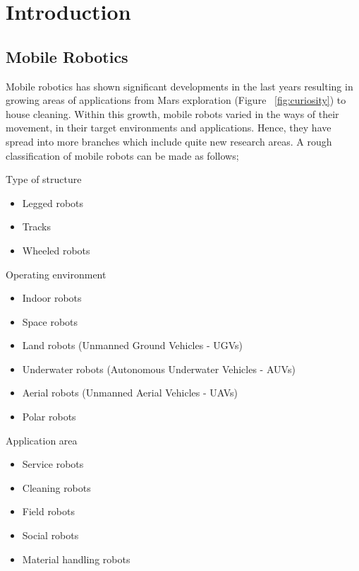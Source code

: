 
\chapter{Introduction}
\label{chap:intro}

\section{Mobile Robotics}
\label{sec:mobile robotics}

Mobile robotics has shown significant developments in the last years resulting in growing areas of applications from Mars exploration (Figure ~\ref{fig:curiosity}) to house cleaning. Within this growth, mobile robots varied in the ways of their movement, in their target environments and applications. Hence, they have spread into more branches which include quite new research areas. A rough classification of mobile robots can be made as follows;

\begin{description}
	\item[Type of structure] 
\end{description}
\begin{itemize}
	\item Legged robots 
	\item Tracks
  \item Wheeled robots 
\end{itemize}
\begin{description}
	\item[Operating environment] 
\end{description}
\begin{itemize}
	\item Indoor robots 	
	\item Space robots 
  \item Land robots (Unmanned Ground Vehicles - UGVs)
	\item Underwater robots (Autonomous Underwater Vehicles - AUVs)
	\item Aerial robots (Unmanned Aerial Vehicles - UAVs) 
	\item Polar robots
\end{itemize}
\begin{description}
	\item[Application area] 
\end{description}
\begin{itemize}
	\item Service robots
  \item Cleaning robots
  \item Field robots 
	\item Social robots
	\item Material handling robots
\end{itemize}


